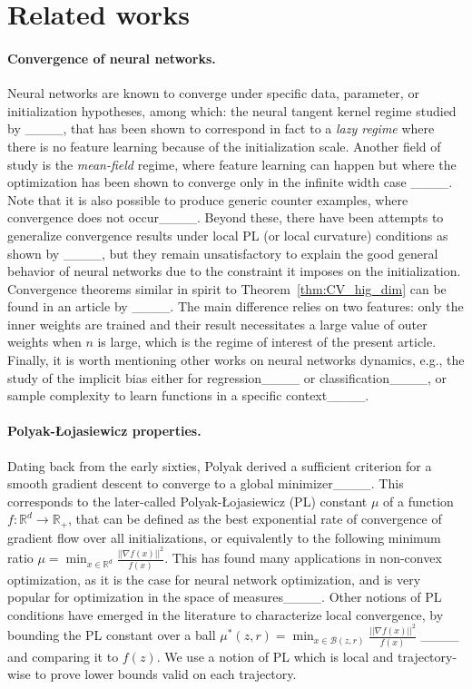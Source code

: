 \section{Related works}
\label{section:related_works}
\paragraph{Convergence of neural networks.} Neural networks are known to converge under specific data, parameter, or initialization hypotheses, among which: the neural tangent kernel regime studied by ____, that has been shown to correspond in fact to a \textit{lazy regime} where there is no feature learning because of the initialization scale. Another field of study is the \textit{mean-field} regime, where feature learning can happen but where the optimization has been shown to converge only in the infinite width case ____. Note that it is also possible to produce generic counter examples, where convergence does not occur____. Beyond these, there have been attempts to generalize convergence results under local PL (or local curvature) conditions as shown by ____, but they remain unsatisfactory to explain the good general behavior of neural networks due to the constraint it imposes on the initialization. Convergence theorems similar in spirit to Theorem~\ref{thm:CV_hig_dim} can be found in an article by ____. The main difference relies on two features: only the inner weights are trained and their result necessitates a large value of outer weights when $n$ is large, which is the regime of interest of the present article. Finally, it is worth mentioning other works on neural networks dynamics, e.g., the study of the implicit bias either for regression____ or classification____, or sample complexity to learn functions in a specific context____.

\paragraph{Polyak-Łojasiewicz properties.} Dating back from the early sixties, Polyak derived a sufficient criterion for a smooth gradient descent to converge to a global minimizer____. This corresponds to the later-called Polyak-Łojasiewicz (PL) constant $\mu$ of a function $f:\mathbb{R}^d\rightarrow\mathbb{R}_+$, that  can be defined as the best exponential rate of convergence of gradient flow over all initializations, or equivalently to the following minimum ratio $\mu = \min_{x\in\mathbb{R}^d}\frac{||\nabla f(x)||^2}{f(x)}$. This has found many applications in non-convex optimization, as it is the case for neural network optimization, and is very popular for optimization in the space of measures____. Other notions of PL conditions have emerged in the literature to characterize local convergence, by bounding the PL constant over a ball $\mu^*(z,r) = \min_{x\in\mathcal{B}(z,r)}\frac{||\nabla f(x)||^2}{f(x)}$ ____ and comparing it to $f(z)$. We use a notion of PL which is local and trajectory-wise to prove lower bounds valid on each trajectory.